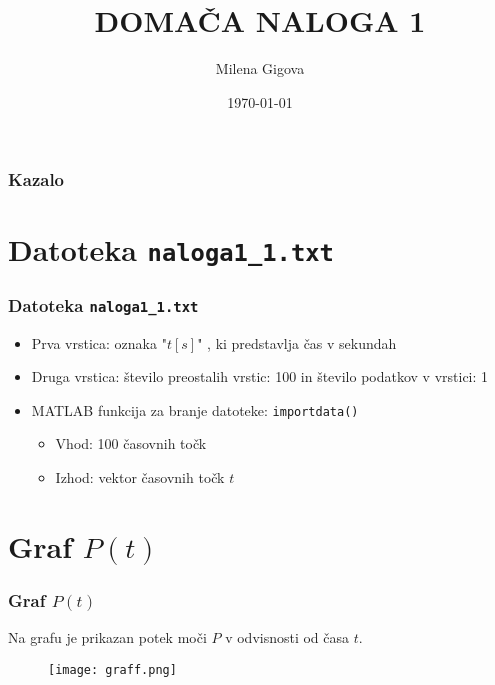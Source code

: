 \documentclass{beamer}
\title{DOMAČA NALOGA 1}
\author{Milena Gigova}
\date{\today}
\begin{document}
\frame{\titlepage}

\begin{frame}
\frametitle{Kazalo}
    \tableofcontents
\end{frame}

\section{Datoteka \texttt{naloga1\_1.txt}}
\begin{frame}
\frametitle{Datoteka \texttt{naloga1\_1.txt}}
    \begin{itemize}
        \item Prva vrstica: oznaka "$t[s]$" , ki predstavlja čas v sekundah
        \item Druga vrstica: število preostalih vrstic: 100 in 
        število podatkov v vrstici: 1
        \item MATLAB funkcija za branje datoteke: \texttt{importdata()}
        \begin{itemize}
            \item Vhod: 100 časovnih točk
            \item Izhod: vektor časovnih točk $t$
        \end{itemize}
    \end{itemize}
\end{frame}

\section{Graf $P(t)$}
\begin{frame}
\frametitle{Graf $P(t)$}
    \begin{itemize}
    Na grafu je prikazan potek moči $P$ v odvisnosti od časa $t$.
    \end{itemize}
    \begin{figure}
        \centering
        \texttt{[image: graff.png]}
            
            \label{fig:enter-label}
    \end{figure}
\end{frame}

\end{document}
